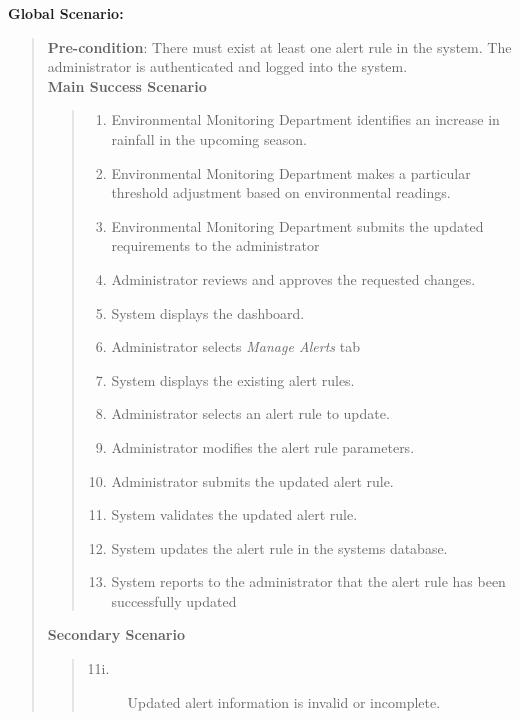\documentclass[]{article}
\begin{document}
\begin{enumerate}[{\bf BE2.}]
        {\bf Global Scenario:}
        	\begin{quote}
        	    \textbf{Pre-condition}: There must exist at least one alert rule in the system. The administrator is authenticated and logged into the system. \\
                \textbf{Main Success Scenario} 
                    \begin{quote}
                    \begin{enumerate}[1.]
                        \item Environmental Monitoring Department identifies an increase in rainfall in the upcoming season.
                        \item Environmental Monitoring Department makes a particular threshold adjustment based on environmental readings.
                        \item Environmental Monitoring Department submits the updated requirements to the administrator
                        \item Administrator reviews and approves the requested changes.
                        \item System displays the dashboard.
                        \item Administrator selects \textit{Manage Alerts} tab
                        \item System displays the existing alert rules.
                        \item Administrator selects an alert rule to update.
                        \item Administrator modifies the alert rule parameters.
                        \item Administrator submits the updated alert rule.
                        \item System validates the updated alert rule.
                        \item System updates the alert rule in the systems database.
                        \item System reports to the administrator that the alert rule has been successfully updated
                    \end{enumerate}
                    \end{quote}
                \textbf{Secondary Scenario} 
                \begin{quote}
                    \begin{description}
                        \item[\textmd{11i.}] Updated alert information is invalid or incomplete.

\end{description}
\end{quote}
\end{quote}
\end{enumerate}
\end{document}
